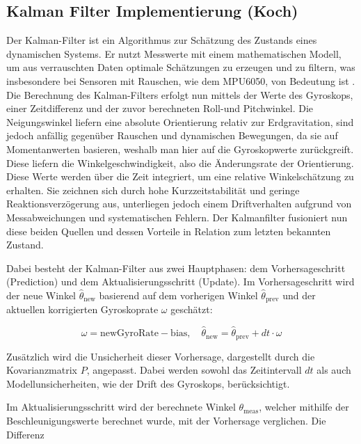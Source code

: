\subsection{Kalman Filter Implementierung (Koch)}
\label{sec:kalman_filter}
Der Kalman-Filter ist ein Algorithmus zur Schätzung des Zustands eines dynamischen Systems. Er nutzt Messwerte mit einem mathematischen Modell, um aus verrauschten Daten optimale Schätzungen zu erzeugen und zu filtern, was insbesondere bei Sensoren mit Rauschen, wie dem MPU6050, von Bedeutung ist \cite{raspberry_rwth_kalman_2025}.
Die Berechnung des Kalman-Filters erfolgt nun mittels der Werte des Gyroskops, einer Zeitdifferenz und der zuvor berechneten Roll-und Pitchwinkel. Die Neigungswinkel liefern eine absolute Orientierung relativ zur Erdgravitation, sind jedoch anfällig gegenüber Rauschen und dynamischen Bewegungen, da sie auf Momentanwerten basieren, weshalb man hier auf die Gyroskopwerte zurückgreift.
Diese liefern die Winkelgeschwindigkeit, also die Änderungsrate der Orientierung. Diese Werte werden über die Zeit integriert, um eine relative Winkelschätzung zu erhalten. Sie zeichnen sich durch hohe Kurzzeitstabilität und geringe Reaktionsverzögerung aus, unterliegen jedoch einem Driftverhalten aufgrund von Messabweichungen und systematischen Fehlern.
Der Kalmanfilter fusioniert nun diese beiden Quellen und dessen Vorteile in Relation zum letzten bekannten Zustand.

Dabei besteht der Kalman-Filter aus zwei Hauptphasen: dem Vorhersageschritt (Prediction) und dem Aktualisierungsschritt (Update). Im Vorhersageschritt wird der neue Winkel $\hat{\theta}_{\text{new}}$ basierend auf dem vorherigen Winkel $\hat{\theta}_{\text{prev}}$ und der aktuellen korrigierten Gyroskoprate $\omega$ geschätzt:

\begin{equation*}
\omega = \text{newGyroRate} - \text{bias}, \quad \hat{\theta}_{\text{new}} = \hat{\theta}_{\text{prev}} + dt \cdot \omega
\end{equation*}

Zusätzlich wird die Unsicherheit dieser Vorhersage, dargestellt durch die Kovarianzmatrix $P$, angepasst. Dabei werden sowohl das Zeitintervall $dt$ als auch Modellunsicherheiten, wie der Drift des Gyroskops, berücksichtigt.

Im Aktualisierungsschritt wird der berechnete Winkel $\theta_{\text{meas}}$, welcher mithilfe der Beschleunigungswerte berechnet wurde, mit der Vorhersage verglichen. Die Differenz

